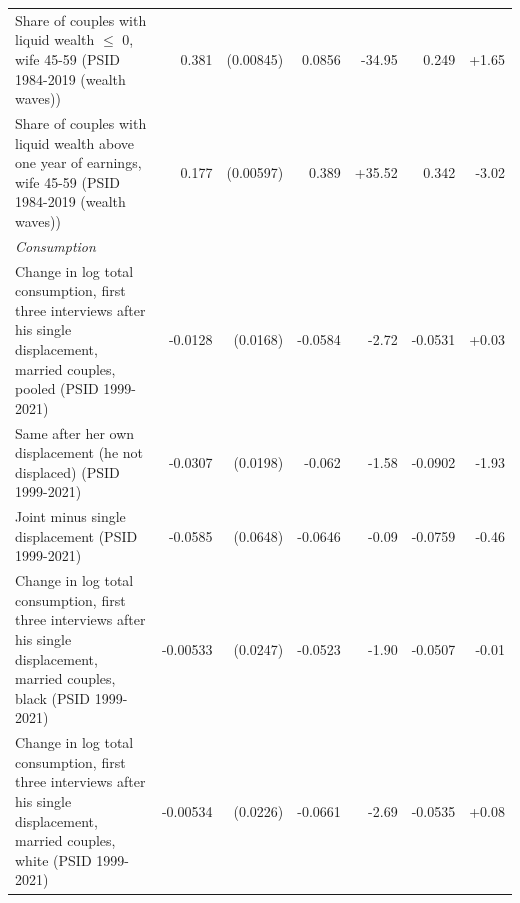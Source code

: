 {\begin{longtable}{p{6.4cm}rrrrrr}
Share of couples with liquid wealth $\le$ 0, wife 45-59 (PSID 1984-2019 (wealth waves)) & 0.381 & (0.00845) & 0.0856 & -34.95 & 0.249 & +1.65 \\
Share of couples with liquid wealth above one year of earnings, wife 45-59 (PSID 1984-2019 (wealth waves)) & 0.177 & (0.00597) & 0.389 & +35.52 & 0.342 & -3.02 \\
\multicolumn{7}{l}{\textit{Consumption}} \\
Change in log total consumption, first three interviews after his single displacement, married couples, pooled (PSID 1999-2021) & -0.0128 & (0.0168) & -0.0584 & -2.72 & -0.0531 & +0.03 \\
Same after her own displacement (he not displaced) (PSID 1999-2021) & -0.0307 & (0.0198) & -0.062 & -1.58 & -0.0902 & -1.93 \\
Joint minus single displacement (PSID 1999-2021) & -0.0585 & (0.0648) & -0.0646 & -0.09 & -0.0759 & -0.46 \\
Change in log total consumption, first three interviews after his single displacement, married couples, black (PSID 1999-2021) & -0.00533 & (0.0247) & -0.0523 & -1.90 & -0.0507 & -0.01 \\
Change in log total consumption, first three interviews after his single displacement, married couples, white (PSID 1999-2021) & -0.00534 & (0.0226) & -0.0661 & -2.69 & -0.0535 & +0.08 \\
\end{longtable}
}
